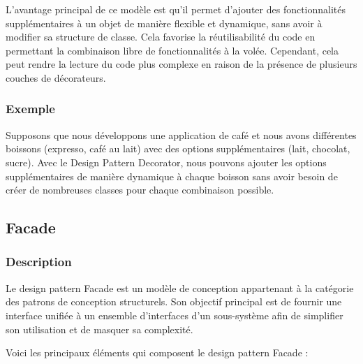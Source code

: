 L'avantage principal de ce modèle est qu'il permet d'ajouter des fonctionnalités supplémentaires à un objet de manière flexible et dynamique, sans avoir à modifier sa structure de classe. Cela favorise la réutilisabilité du code en permettant la combinaison libre de fonctionnalités à la volée. Cependant, cela peut rendre la lecture du code plus complexe en raison de la présence de plusieurs couches de décorateurs.


\subsubsection{Exemple}

Supposons que nous développons une application de café et nous avons différentes boissons (expresso, café au lait) avec des options supplémentaires (lait, chocolat, sucre). Avec le Design Pattern Decorator, nous pouvons ajouter les options supplémentaires de manière dynamique à chaque boisson sans avoir besoin de créer de nombreuses classes pour chaque combinaison possible.




\newpage

\subsection{Facade}

\subsubsection{Description}

Le design pattern Facade est un modèle de conception appartenant à la catégorie des patrons de conception structurels. Son objectif principal est de fournir une interface unifiée à un ensemble d'interfaces d'un sous-système afin de simplifier son utilisation et de masquer sa complexité.

Voici les principaux éléments qui composent le design pattern Facade :

